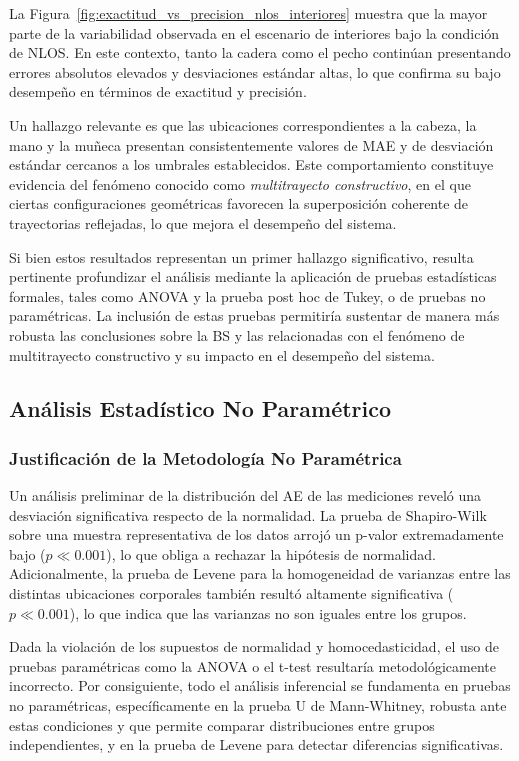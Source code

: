 La Figura~\ref{fig:exactitud_vs_precision_nlos_interiores} muestra que la mayor parte de la variabilidad observada en el escenario de interiores bajo la condición de NLOS. En este contexto, tanto la cadera como el pecho continúan presentando errores absolutos elevados y desviaciones estándar altas, lo que confirma su bajo desempeño en términos de exactitud y precisión.

Un hallazgo relevante es que las ubicaciones correspondientes a la cabeza, la mano y la muñeca presentan consistentemente valores de MAE y de desviación estándar cercanos a los umbrales establecidos. Este comportamiento constituye evidencia del fenómeno conocido como \textit{multitrayecto constructivo}, en el que ciertas configuraciones geométricas favorecen la superposición coherente de trayectorias reflejadas, lo que mejora el desempeño del sistema.

Si bien estos resultados representan un primer hallazgo significativo, resulta pertinente profundizar el análisis mediante la aplicación de pruebas estadísticas formales, tales como ANOVA y la prueba post hoc de Tukey, o de pruebas no paramétricas. La inclusión de estas pruebas permitiría sustentar de manera más robusta las conclusiones sobre la BS y las relacionadas con el fenómeno de multitrayecto constructivo y su impacto en el desempeño del sistema.

\subsection{Análisis Estadístico No Paramétrico}

\subsubsection{Justificación de la Metodología No Paramétrica}

Un análisis preliminar de la distribución del AE de las mediciones reveló una desviación significativa respecto de la normalidad. La prueba de Shapiro-Wilk sobre una muestra representativa de los datos arrojó un p-valor extremadamente bajo ($p \ll 0.001$), lo que obliga a rechazar la hipótesis de normalidad. Adicionalmente, la prueba de Levene para la homogeneidad de varianzas entre las distintas ubicaciones corporales también resultó altamente significativa ($p \ll 0.001$), lo que indica que las varianzas no son iguales entre los grupos.

Dada la violación de los supuestos de normalidad y homocedasticidad, el uso de pruebas paramétricas como la ANOVA o el t-test resultaría metodológicamente incorrecto. Por consiguiente, todo el análisis inferencial se fundamenta en pruebas no paramétricas, específicamente en la prueba U de Mann-Whitney, robusta ante estas condiciones y que permite comparar distribuciones entre grupos independientes, y en la prueba de Levene para detectar diferencias significativas.


